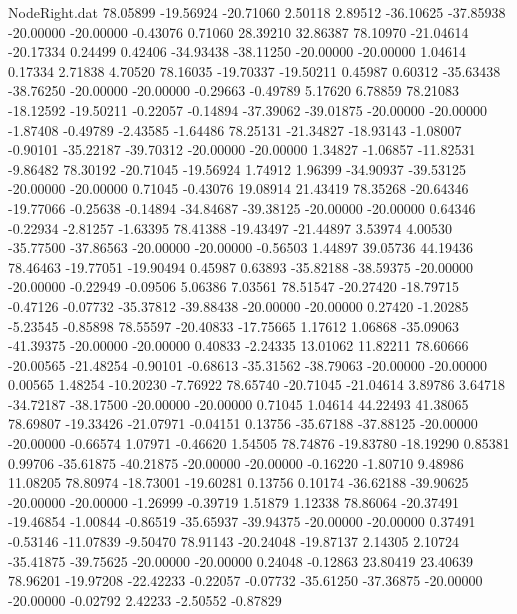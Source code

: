 \begin{filecontents}{NodeRight.dat}
  78.05899  -19.56924  -20.71060     2.50118    2.89512  -36.10625  -37.85938  -20.00000  -20.00000   -0.43076    0.71060   28.39210   32.86387
  78.10970  -21.04614  -20.17334     0.24499    0.42406  -34.93438  -38.11250  -20.00000  -20.00000    1.04614    0.17334    2.71838    4.70520
  78.16035  -19.70337  -19.50211     0.45987    0.60312  -35.63438  -38.76250  -20.00000  -20.00000   -0.29663   -0.49789    5.17620    6.78859
  78.21083  -18.12592  -19.50211    -0.22057   -0.14894  -37.39062  -39.01875  -20.00000  -20.00000   -1.87408   -0.49789   -2.43585   -1.64486
  78.25131  -21.34827  -18.93143    -1.08007   -0.90101  -35.22187  -39.70312  -20.00000  -20.00000    1.34827   -1.06857  -11.82531   -9.86482
  78.30192  -20.71045  -19.56924     1.74912    1.96399  -34.90937  -39.53125  -20.00000  -20.00000    0.71045   -0.43076   19.08914   21.43419
  78.35268  -20.64346  -19.77066    -0.25638   -0.14894  -34.84687  -39.38125  -20.00000  -20.00000    0.64346   -0.22934   -2.81257   -1.63395
  78.41388  -19.43497  -21.44897     3.53974    4.00530  -35.77500  -37.86563  -20.00000  -20.00000   -0.56503    1.44897   39.05736   44.19436
  78.46463  -19.77051  -19.90494     0.45987    0.63893  -35.82188  -38.59375  -20.00000  -20.00000   -0.22949   -0.09506    5.06386    7.03561
  78.51547  -20.27420  -18.79715    -0.47126   -0.07732  -35.37812  -39.88438  -20.00000  -20.00000    0.27420   -1.20285   -5.23545   -0.85898
  78.55597  -20.40833  -17.75665     1.17612    1.06868  -35.09063  -41.39375  -20.00000  -20.00000    0.40833   -2.24335   13.01062   11.82211
  78.60666  -20.00565  -21.48254    -0.90101   -0.68613  -35.31562  -38.79063  -20.00000  -20.00000    0.00565    1.48254  -10.20230   -7.76922
  78.65740  -20.71045  -21.04614     3.89786    3.64718  -34.72187  -38.17500  -20.00000  -20.00000    0.71045    1.04614   44.22493   41.38065
  78.69807  -19.33426  -21.07971    -0.04151    0.13756  -35.67188  -37.88125  -20.00000  -20.00000   -0.66574    1.07971   -0.46620    1.54505
  78.74876  -19.83780  -18.19290     0.85381    0.99706  -35.61875  -40.21875  -20.00000  -20.00000   -0.16220   -1.80710    9.48986   11.08205
  78.80974  -18.73001  -19.60281     0.13756    0.10174  -36.62188  -39.90625  -20.00000  -20.00000   -1.26999   -0.39719    1.51879    1.12338
  78.86064  -20.37491  -19.46854    -1.00844   -0.86519  -35.65937  -39.94375  -20.00000  -20.00000    0.37491   -0.53146  -11.07839   -9.50470
  78.91143  -20.24048  -19.87137     2.14305    2.10724  -35.41875  -39.75625  -20.00000  -20.00000    0.24048   -0.12863   23.80419   23.40639
  78.96201  -19.97208  -22.42233    -0.22057   -0.07732  -35.61250  -37.36875  -20.00000  -20.00000   -0.02792    2.42233   -2.50552   -0.87829

\end{filecontents}
